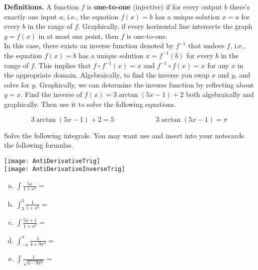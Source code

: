 \documentclass[answers]{exam}
\begin{document}
\begin{questions}


\question \textbf{Definitions.} A function $f$ is \textbf{one-to-one} (injective) if for every output $b$ there's exactly one input $a$, i.e., the equation $f(x) = b$ has a unique solution $x = a$ for every $b$ in the range of $f$. Graphically, if every horizontal line intersects the graph $y = f(x)$ in at most one point, then $f$ is one-to-one.\\
 In this case, there exists an inverse function denoted by $f^{-1}$ that undoes $f$, i.e., the equation $f(x) = b$ has a unique solution $x = f^{-1}(b)$ for every $b$ in the range of $f$. This implies that $f\circ f^{-1}(x) = x$ and $f^{-1}\circ f(x) = x$ for any $x$ in the appropriate domain. Algebraically, to find the inverse you swap $x$ and $y$, and solve for $y$. Graphically, we can determine the inverse function by reflecting about $y = x$. Find the inverse of $f(x) = 3\arctan(5x-1)+2$ both algebraically and graphically. Then use it to solve the following equations.
 
\vspace{2in }

 \[ 3\arctan(5x-1)+2 = 5 \hspace{1in} 3\arctan(5x-1)= \pi \]

\vspace{1in}

\question Solve the following integrals. You may want use and insert into your notecards the following formulas.

\texttt{[image: AntiDerivativeTrig]}\\

\texttt{[image: AntiDerivativeInverseTrig]}

\begin{enumerate}[(a)]
\item $\displaystyle \int \frac{5x}{1+x^2} = $

\hfill \break
\hfill \break
\hfill \break
\hfill \break
\hfill \break
\hfill \break

\item $\displaystyle \int_3^5 \frac{1}{1+x^2} = $

\hfill \break
\hfill \break
\hfill \break
\hfill \break
\hfill \break
\hfill \break

\item $\displaystyle  \int \frac{5x+1}{1+x^2} = $

\hfill \break
\hfill \break
\hfill \break
\hfill \break
\hfill \break
\hfill \break
\hfill \break

\item $\displaystyle  \int_{-\pi}^{\pi} \frac{1}{4+9x^2} = $

\hfill \break
\hfill \break
\hfill \break
\hfill \break
\hfill \break
\hfill \break
\hfill \break

\item $\displaystyle  \int \frac{1}{\sqrt{4-9x^2}} = $

\hfill \break
\hfill \break
\hfill \break
\hfill \break

\end{enumerate}



\end{questions}
\end{document}
